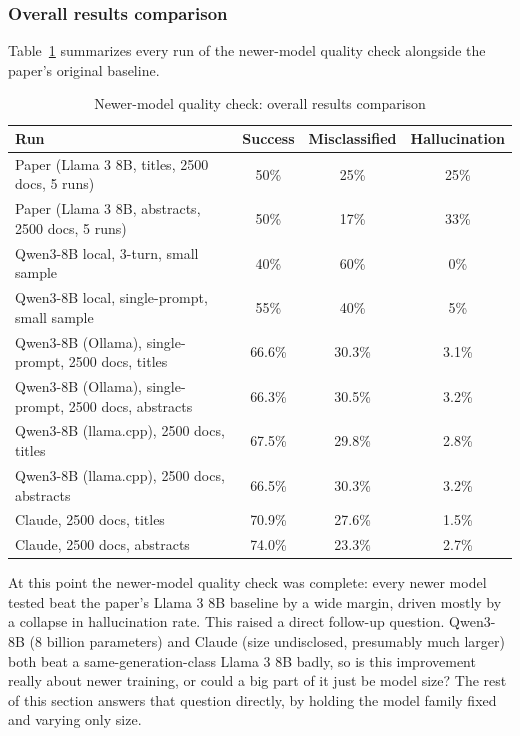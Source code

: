 \subsubsection{Overall results comparison}

Table~\ref{tab:overall-comparison} summarizes every run of the newer-model quality check alongside the paper's original baseline.

\begin{table}[h]
\centering
\caption{Newer-model quality check: overall results comparison}
\label{tab:overall-comparison}
\begin{tabular}{lccc}
\toprule
Run & Success & Misclassified & Hallucination \\
\midrule
Paper (Llama 3 8B, titles, 2500 docs, 5 runs) & 50\% & 25\% & 25\% \\
Paper (Llama 3 8B, abstracts, 2500 docs, 5 runs) & 50\% & 17\% & 33\% \\
Qwen3-8B local, 3-turn, small sample & 40\% & 60\% & 0\% \\
Qwen3-8B local, single-prompt, small sample & 55\% & 40\% & 5\% \\
Qwen3-8B (Ollama), single-prompt, 2500 docs, titles & 66.6\% & 30.3\% & 3.1\% \\
Qwen3-8B (Ollama), single-prompt, 2500 docs, abstracts & 66.3\% & 30.5\% & 3.2\% \\
Qwen3-8B (llama.cpp), 2500 docs, titles & 67.5\% & 29.8\% & 2.8\% \\
Qwen3-8B (llama.cpp), 2500 docs, abstracts & 66.5\% & 30.3\% & 3.2\% \\
Claude, 2500 docs, titles & 70.9\% & 27.6\% & 1.5\% \\
Claude, 2500 docs, abstracts & 74.0\% & 23.3\% & 2.7\% \\
\bottomrule
\end{tabular}
\end{table}

At this point the newer-model quality check was complete: every newer model tested beat the paper's Llama 3 8B baseline by a wide margin, driven mostly by a collapse in hallucination rate. This raised a direct follow-up question. Qwen3-8B (8 billion parameters) and Claude (size undisclosed, presumably much larger) both beat a same-generation-class Llama 3 8B badly, so is this improvement really about newer training, or could a big part of it just be model size? The rest of this section answers that question directly, by holding the model family fixed and varying only size.

